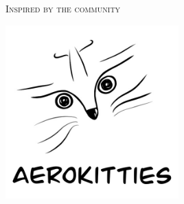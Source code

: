 \begin{center}
	\thispagestyle{empty}
	\centering
	\hfill
	
	\vspace{1cm}

	\begin{center}
		\LARGE \textsc{Inspired by the community}
	\end{center}

	\vspace{2.5cm}
	\includegraphics[width=0.5\textwidth]{images/logo.jpg}
\end{center}

\vfill
\pagebreak
% 





	


